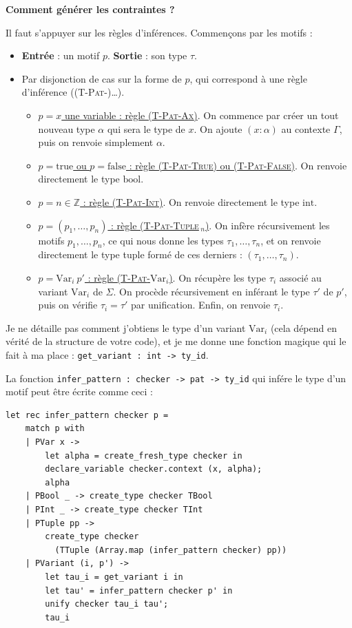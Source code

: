 \documentclass[11pt]{article}
\begin{document}
\textbf{Comment générer les contraintes ?}

Il faut s'appuyer sur les règles d'inférences. Commençons par les motifs :

\begin{itemize}
    \item \textbf{Entrée} : un motif $p$. \textbf{Sortie} : son type $\tau$.
    \item Par disjonction de cas sur la forme de $p$, qui correspond à une règle d'inférence ({\scshape(T-Pat-)\dots}).
    \begin{itemize}
        \item \underline{$p=x$ une variable : règle ({\scshape{T-Pat-Ax}})}. On commence par créer un tout nouveau type $\alpha$ qui sera le type de $x$. On ajoute $(x:\alpha)$ au contexte $\Gamma$, puis on renvoie simplement $\alpha$.
        \item \underline{$p=\text{true}$ ou $p=\text{false}$ : règle ({\scshape{T-Pat-True}}) ou ({\scshape{T-Pat-False}})}. On renvoie directement le type $\text{bool}$.
        \item \underline{$p=n\in\mathbb{Z}$ : règle ({\scshape{T-Pat-Int}})}. On renvoie directement le type $\text{int}$.
        \item \underline{$p=(p_1, \dots, p_n)$ : règle ({\scshape{T-Pat-Tuple}}$\,_n$)}. On infère récursivement les motifs $p_1, \dots, p_n$, ce qui nous donne les types $\tau_1, \dots, \tau_n$, et on renvoie directement le type tuple formé de ces derniers : $\left(\tau_1, \dots, \tau_n\right)$.
        \item \underline{$p=\text{Var}_i~p'$ : règle ({\scshape{T-Pat}}-$\text{Var}_i$)}. On récupère les type $\tau_i$ associé au variant $\text{Var}_i$ de $\Sigma$. On procède récursivement en inférant le type $\tau'$ de $p'$, puis on vérifie $\tau_i=\tau'$ par unification. Enfin, on renvoie $\tau_i$.
    \end{itemize}
\end{itemize}

Je ne détaille pas comment j'obtiens le type d'un variant $\text{Var}_i$ (cela dépend en vérité de la structure de votre code), et je me donne une fonction magique qui le fait à ma place : \verb|get_variant : int -> ty_id|.

La fonction \verb|infer_pattern : checker -> pat -> ty_id| qui infére le type d'un motif peut être écrite comme ceci :

\begin{lstlisting}
let rec infer_pattern checker p =
    match p with
    | PVar x -> 
        let alpha = create_fresh_type checker in
        declare_variable checker.context (x, alpha);
        alpha
    | PBool _ -> create_type checker TBool
    | PInt _ -> create_type checker TInt
    | PTuple pp ->
        create_type checker
          (TTuple (Array.map (infer_pattern checker) pp))
    | PVariant (i, p') ->
        let tau_i = get_variant i in
        let tau' = infer_pattern checker p' in
        unify checker tau_i tau';
        tau_i    
\end{lstlisting}
\end{document}
